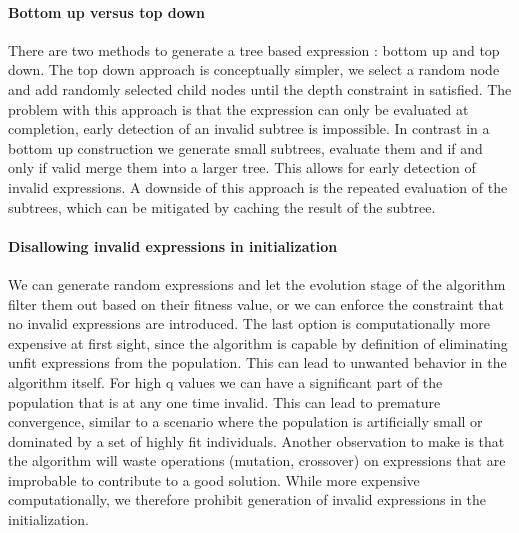 \paragraph{Bottom up versus top down}
There are two methods to generate a tree based expression : bottom up and top down. The top down approach is conceptually simpler, we select a random node and add randomly selected child nodes until the depth constraint in satisfied. The problem with this approach is that the expression can only be evaluated at completion, early detection of an invalid subtree is impossible. 
In contrast in a bottom up construction we generate small subtrees, evaluate them and if and only if valid merge them into a larger tree. This allows for early detection of invalid expressions. A downside of this approach is the repeated evaluation of the subtrees, which can be mitigated by caching the result of the subtree.

\paragraph{Disallowing invalid expressions in initialization}
We can generate random expressions and let the evolution stage of the algorithm filter them out based on their fitness value, or we can enforce the constraint that no invalid expressions are introduced. The last option is computationally more expensive at first sight, since the algorithm is capable by definition of eliminating unfit expressions from the population. 
This can lead to unwanted behavior in the algorithm itself. For high q values we can have a significant part of the population that is at any one time invalid. This can lead to premature convergence, similar to a scenario where the population is artificially small or dominated by a set of highly fit individuals. Another observation to make is that the algorithm will waste operations (mutation, crossover) on expressions that are improbable to contribute to a good solution. 
While more expensive computationally, we therefore prohibit generation of invalid expressions in the initialization. 


